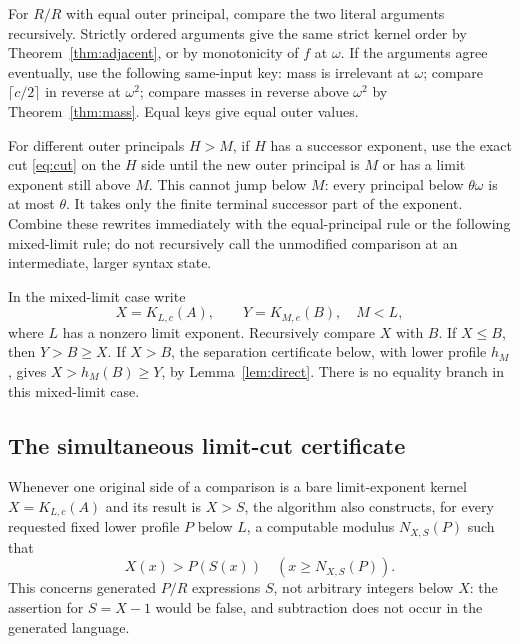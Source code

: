 \documentclass[11pt,a4paper]{article}
\newcommand{\KK}[2]{K_{#1,#2}}
\begin{document}
For $R/R$ with equal outer principal, compare the two literal arguments
recursively. Strictly ordered arguments give the same strict kernel order
by Theorem~\ref{thm:adjacent}, or by monotonicity of $f$ at $\omega$.
If the arguments agree eventually, use the following same-input key:
mass is irrelevant at $\omega$; compare $\lceil c/2\rceil$ in reverse at
$\omega^2$; compare masses in reverse above $\omega^2$ by
Theorem~\ref{thm:mass}. Equal keys give equal outer values.

For different outer principals $H>M$, if $H$ has a successor exponent,
use the exact cut \eqref{eq:cut} on the $H$ side until the new outer
principal is $M$ or has a limit exponent still above $M$.
This cannot jump below $M$: every principal below $\theta\omega$ is at
most $\theta$. It takes only the finite terminal successor part of the
exponent. Combine these rewrites immediately with the equal-principal
rule or the following mixed-limit rule; do not recursively call the
unmodified comparison at an intermediate, larger syntax state.

In the mixed-limit case write
\[
                  X=\KK Lc(A),\qquad Y=\KK Me(B),\quad M<L,
                                                               \tag{8.1}
\]
where $L$ has a nonzero limit exponent. Recursively compare $X$ with $B$.
If $X\le B$, then $Y>B\ge X$. If $X>B$, the separation certificate
below, with lower profile $h_M$, gives
$X>h_M(B)\ge Y$, by Lemma~\ref{lem:direct}. There is no equality branch
in this mixed-limit case.

\subsection{The simultaneous limit-cut certificate}
Whenever one original side of a comparison is a bare limit-exponent
kernel $X=\KK Lc(A)$ and its result is $X>S$, the algorithm also
constructs, for every requested fixed lower profile $P$ below $L$, a
computable modulus $N_{X,S}(P)$ such that
\[
                   X(x)>P(S(x))\quad(x\ge N_{X,S}(P)). \tag{8.2}
\]
This concerns generated $P/R$ expressions $S$, not arbitrary integers
below $X$: the assertion for $S=X-1$ would be false, and subtraction
does not occur in the generated language.
\end{document}
